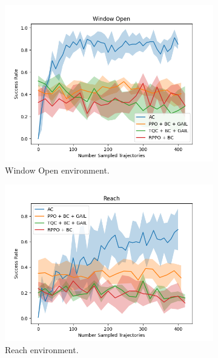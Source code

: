 \begin{figure}[htbp]
  \centering
  \begin{subfigure}[b]{0.45\textwidth}
    \includegraphics[width=\textwidth]{images/4_400/Window Open.png}
    \caption{Window Open environment.}
    \label{fig:plot1}
  \end{subfigure}
  \hfill
  \begin{subfigure}[b]{0.45\textwidth}
    \includegraphics[width=\textwidth]{images/4_400/Reach.png}
    \caption{Reach environment.}
    \label{fig:plot2}
  \end{subfigure}
  \medskip
  \begin{subfigure}[b]{0.45\textwidth}

\end{subfigure}
\end{figure}
